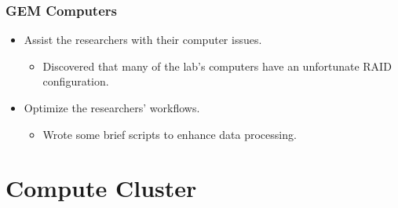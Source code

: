 \documentclass[aspectratio=169]{beamer}
\begin{document}
\begin{frame}

  \frametitle{GEM Computers}

  \begin{itemize}
    \item Assist the researchers with their computer issues.
      \begin{itemize}
        \item Discovered that many of the lab's computers have an unfortunate
          RAID configuration.
      \end{itemize}
      \item Optimize the researchers' workflows.
        \begin{itemize}
          \item Wrote some brief scripts to enhance data processing.
        \end{itemize}
  \end{itemize}

\end{frame}



\section{Compute Cluster}
\end{document}
